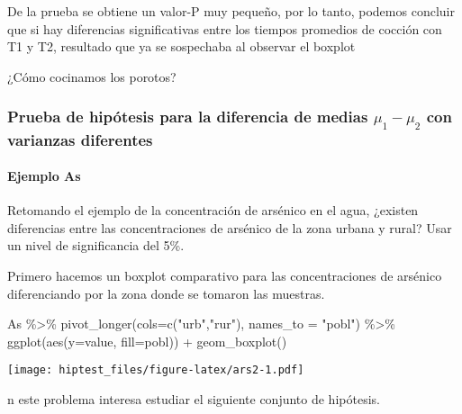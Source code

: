 \documentclass[
]{article}
\newenvironment{Shaded}{}{}
\newcommand{\AttributeTok}[1]{\textcolor[rgb]{0.49,0.56,0.16}{#1}}
\newcommand{\FunctionTok}[1]{\textcolor[rgb]{0.02,0.16,0.49}{#1}}
\newcommand{\NormalTok}[1]{#1}
\newcommand{\SpecialCharTok}[1]{\textcolor[rgb]{0.25,0.44,0.63}{#1}}
\newcommand{\StringTok}[1]{\textcolor[rgb]{0.25,0.44,0.63}{#1}}
\begin{document}
De la prueba se obtiene un valor-P muy pequeño, por lo tanto, podemos
concluir que si hay diferencias significativas entre los tiempos
promedios de cocción con T1 y T2, resultado que ya se sospechaba al
observar el boxplot

¿Cómo cocinamos los porotos?

\hypertarget{prueba-de-hipuxf3tesis-para-la-diferencia-de-medias-mu_1-mu_2-con-varianzas-diferentes}{%
\subsubsection{\texorpdfstring{Prueba de hipótesis para la diferencia de
medias \(\mu_1-\mu_2\) con varianzas
diferentes}{Prueba de hipótesis para la diferencia de medias \textbackslash mu\_1-\textbackslash mu\_2 con varianzas diferentes}}\label{prueba-de-hipuxf3tesis-para-la-diferencia-de-medias-mu_1-mu_2-con-varianzas-diferentes}}

\hypertarget{ejemplo-as-1}{%
\paragraph{Ejemplo As}\label{ejemplo-as-1}}

Retomando el ejemplo de la concentración de arsénico en el agua,
¿existen diferencias entre las concentraciones de arsénico de la zona
urbana y rural? Usar un nivel de significancia del 5\%.

Primero hacemos un boxplot comparativo para las concentraciones de
arsénico diferenciando por la zona donde se tomaron las muestras.

\begin{Shaded}
\begin{Highlighting}[]
\NormalTok{As }\SpecialCharTok{\%\textgreater{}\%} \FunctionTok{pivot\_longer}\NormalTok{(}\AttributeTok{cols=}\FunctionTok{c}\NormalTok{(}\StringTok{"urb"}\NormalTok{,}\StringTok{"rur"}\NormalTok{), }\AttributeTok{names\_to =} \StringTok{"pobl"}\NormalTok{) }\SpecialCharTok{\%\textgreater{}\%} 
  \FunctionTok{ggplot}\NormalTok{(}\FunctionTok{aes}\NormalTok{(}\AttributeTok{y=}\NormalTok{value, }\AttributeTok{fill=}\NormalTok{pobl)) }\SpecialCharTok{+}
  \FunctionTok{geom\_boxplot}\NormalTok{()}
\end{Highlighting}
\end{Shaded}

\texttt{[image: hiptest\_files/figure-latex/ars2-1.pdf]}

n este problema interesa estudiar el siguiente conjunto de hipótesis.
\end{document}
